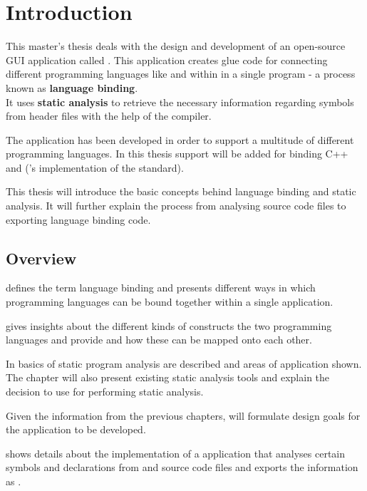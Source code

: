 \chapter{Introduction}

This master's thesis deals with the design and development of an open-source GUI application called . This application creates glue code for connecting different programming languages like  and  within in a single program - a process known as \textbf{language binding}.\\
It uses \textbf{static analysis} to retrieve the necessary information regarding symbols from  header files with the help of the   compiler.

The application has been developed in order to support a multitude of different programming languages. In this thesis support will be added for binding C++ and  ('s implementation of the  standard).

This thesis will introduce the basic concepts behind language binding and static analysis. It will further explain the process from analysing source code files to exporting language binding code.

\section{Overview}

 defines the term language binding and presents different ways in which programming languages can be bound together within a single application.

 gives insights about the different kinds of constructs the two programming languages  and  provide and how these can be mapped onto each other.

In  basics of static program analysis are described and areas of application shown. The chapter will also present existing static analysis tools and explain the decision to use  for performing static analysis.

Given the information from the previous chapters,  will formulate design goals for the application to be developed.

 shows details about the implementation of a  application that analyses certain symbols and declarations from  and  source code files and exports the information as .

